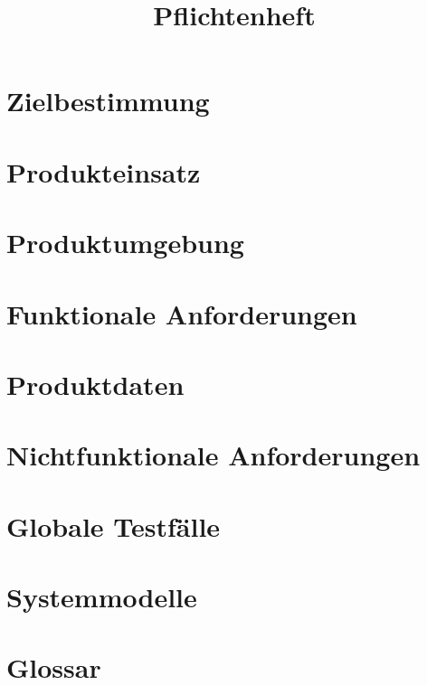 \documentclass[a4paper, 11pt]{article}
\title{Pflichtenheft}
\begin{document}

\maketitle
\newpage
\tableofcontents
\newpage


\section{Zielbestimmung}

\section{Produkteinsatz}

\section{Produktumgebung}

\section{Funktionale Anforderungen}

\section{Produktdaten}

\section{Nichtfunktionale Anforderungen}

\section{Globale Testfälle}

\section{Systemmodelle}

\section{Glossar}
\end{document}
